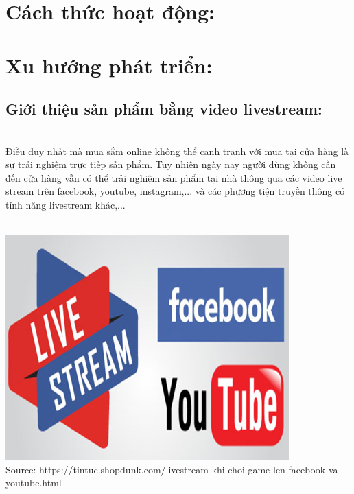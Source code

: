 \documentclass[13pt,a4paper]{article}
\begin{document}
\section{Cách thức hoạt động:} 
\section{Xu hướng phát triển:}
    \subsection{Giới thiệu sản phẩm bằng video livestream:}\\
    Điều duy nhất mà mua sắm online không thể canh tranh với mua tại cửa hàng là sự trải nghiệm trực tiếp sản phẩm. Tuy nhiên ngày nay người dùng không cần đến cửa hàng vẫn có thể trải nghiệm sản phẩm tại nhà thông qua các video live stream trên facebook, youtube, instagram,... và các phương tiện truyền thông có tính năng livestream khác,...\\
    \\\begin{center}
    \includegraphics[scale=0.6]{images/f&u.png} \\
    \fontsize{10pt}{1.2pt}\selectfont
    Source: https://tintuc.shopdunk.com/livestream-khi-choi-game-len-facebook-va-youtube.html
    \end{center}
\end{document}
